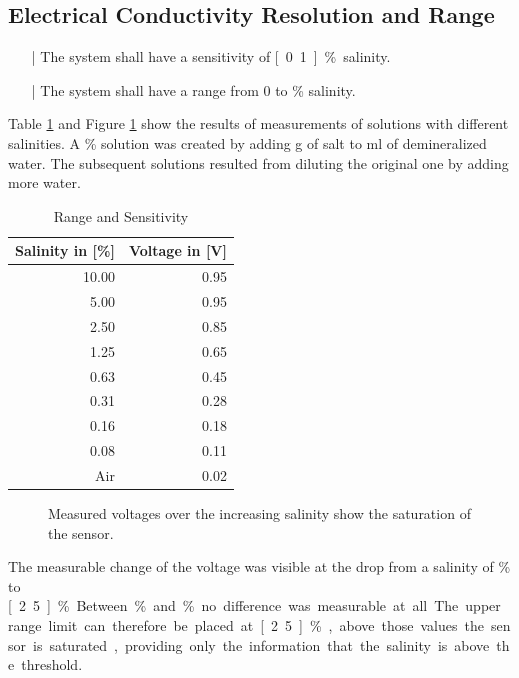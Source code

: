 \subsection{Electrical Conductivity Resolution and Range}

\begin{itemize}
\item[|]  The system shall have a sensitivity of  \unit[0.1]{\%} salinity.
\item[|]  The system shall have a range from 0 to \unit[5]{\%} salinity.
\end{itemize}

Table \ref{tab:rns} and Figure \ref{fig:rns} show the results of measurements of solutions with different salinities. A \unit[10]{\%} solution was created by adding \unit[5]{g} of salt to \unit[50]{ml} of demineralized water. The subsequent solutions resulted from diluting the original one by adding more water.

\begin{table}
    \centering

    \caption[Range and Sensitivity]{Range and Sensitivity}
    \label{tab:rns}
    \begin{tabular}{rr}
        	\toprule
        	Salinity in [\%] & Voltage in [V] \tabularnewline
        	\midrule
		10.00 & 0.95 \tabularnewline
        	5.00 & 0.95 \tabularnewline
		2.50 & 0.85 \tabularnewline
		1.25 & 0.65 \tabularnewline
		0.63 & 0.45 \tabularnewline
		0.31 & 0.28 \tabularnewline
		0.16 & 0.18 \tabularnewline
		0.08 & 0.11 \tabularnewline
		Air & 0.02 \tabularnewline
        \bottomrule
    \end{tabular}
\end{table}

\begin{figure}[H]
	\begin{center}
		
		\caption{Measured voltages over the increasing salinity show the saturation of the sensor.}
		\label{fig:rns}
	\end{center}
\end{figure}

The measurable change of the voltage was visible at the drop from a salinity of \unit[5]{\%} to \unit[2.5]{\%}. Between \unit[10]{\%} and \unit[5]{\%} no difference was measurable at all. The upper range limit can therefore be placed at \unit[2.5]{\%}, above those values the sensor is saturated, providing only the information that the salinity is above the threshold.

